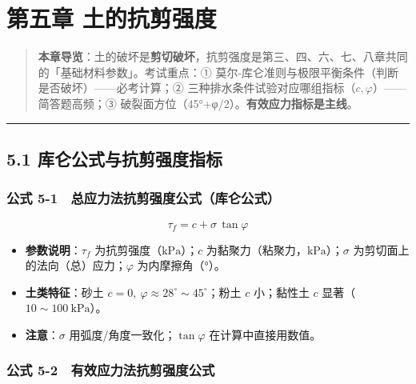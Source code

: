 \documentclass[
]{article}
\author{}
\date{}
\providecommand{\tightlist}{%
  \setlength{\itemsep}{0pt}\setlength{\parskip}{0pt}}
\begin{document}
\section{第五章
土的抗剪强度}\label{ux7b2cux4e94ux7ae0-ux571fux7684ux6297ux526aux5f3aux5ea6}

\begin{quote}
\textbf{本章导览}：土的破坏是\textbf{剪切破坏}，抗剪强度是第三、四、六、七、八章共同的「基础材料参数」。考试重点：①
莫尔-库仑准则与极限平衡条件（判断是否破坏）------必考计算；②
三种排水条件试验对应哪组指标（\(c,\varphi\)）------简答题高频；③
破裂面方位（45°+φ/2）。\textbf{有效应力指标是主线}。
\end{quote}

\begin{center}\rule{0.5\linewidth}{0.5pt}\end{center}

\subsection{5.1
库仑公式与抗剪强度指标}\label{ux5e93ux4ed1ux516cux5f0fux4e0eux6297ux526aux5f3aux5ea6ux6307ux6807}

\subsubsection{公式
5-1　总应力法抗剪强度公式（库仑公式）}\label{ux516cux5f0f-5-1-ux603bux5e94ux529bux6cd5ux6297ux526aux5f3aux5ea6ux516cux5f0fux5e93ux4ed1ux516cux5f0f}

\[\boxed{\tau_f=c+\sigma\,\tan\varphi}\]

\begin{itemize}
\tightlist
\item
  \textbf{参数说明}：\(\tau_f\) 为抗剪强度（\(\mathrm{kPa}\)）；\(c\)
  为黏聚力（粘聚力，\(\mathrm{kPa}\)）；\(\sigma\)
  为剪切面上的法向（总）应力；\(\varphi\) 为内摩擦角（°）。
\item
  \textbf{土类特征}：砂土
  \(c=0,\ \varphi\approx28^{\circ}\sim45^{\circ}\)；粉土 \(c\)
  小；黏性土 \(c\) 显著（\(10\sim100\ \mathrm{kPa}\)）。
\item
  \textbf{注意}：\(\sigma\) 用弧度/角度一致化；\(\tan\varphi\)
  在计算中直接用数值。
\end{itemize}

\subsubsection{公式
5-2　有效应力法抗剪强度公式}\label{ux516cux5f0f-5-2-ux6709ux6548ux5e94ux529bux6cd5ux6297ux526aux5f3aux5ea6ux516cux5f0f}
\end{document}
